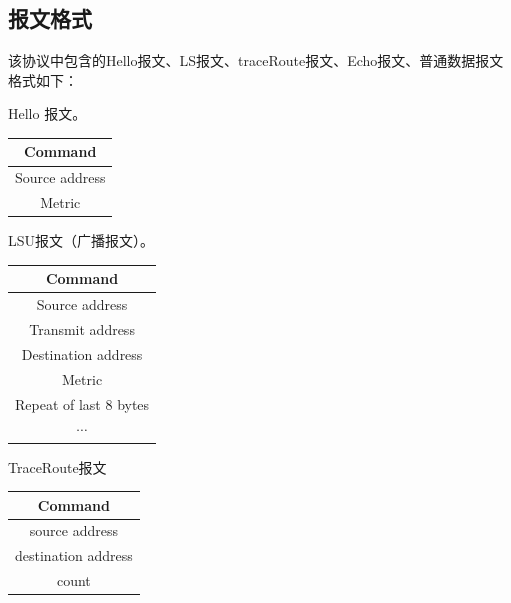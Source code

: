 	\subsection{报文格式} %
	\label{sub:报文格式}
		该协议中包含的Hello报文、LS报文、traceRoute报文、Echo报文、普通数据报文格式如下：
		\par Hello 报文。
	\begin{table}[H]
	\centering
		\begin{tabular}{|c|}
			\hline
			Command \\
			\hline
			Source address \\
			\hline
			Metric \\
			\hline
		\end{tabular}		
	\end{table}
	\newpage
	LSU报文（广播报文）。
	\begin{table}[H]
	\centering
		\begin{tabular}{|c|}
			\hline
			Command \\
			\hline
			Source address \\
			\hline
			Transmit address \\
			\hline
			Destination address \\
			\hline
			Metric \\
			\hline
			Repeat of last 8 bytes \\
			\hline
			$\cdots$ \\
			\hline
		\end{tabular}		
	\end{table}

	TraceRoute报文
	\begin{table}[H]
	\centering
		\begin{tabular}{|c|}
			\hline
			Command \\
			\hline
			source address \\
			\hline
			destination address \\
			\hline
			count \\
			\hline
		\end{tabular}		
	\end{table}	

